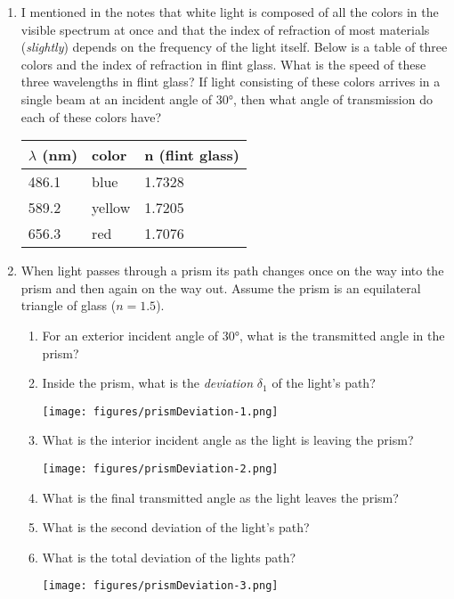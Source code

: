 \begin{enumerate}
\item
I mentioned in the notes that white light is composed of all the colors in the visible spectrum at once and that the index of refraction of most materials (\emph{slightly}) depends on the frequency of the light itself. Below is a table of three colors and the index of refraction in flint glass. What is the speed of these three wavelengths in flint glass? If light consisting of these colors arrives in a single beam at an incident angle of \ang{30}, then what angle of transmission do each of these colors have?

 \begin{tabular}{lll}
 	\toprule
 	$\lambda$ (nm) & color & n (flint glass) \\
 	\midrule
 	\midrule
 	486.1 & blue & 1.7328\\
 	589.2 & yellow & 1.7205 \\
 	656.3 & red & 1.7076 \\
 	\bottomrule
 \end{tabular}

\item
When light passes through a prism its path changes once on the way into the prism and then again on the way out. Assume the prism is an equilateral triangle of glass ($n=1.5$).

\begin{enumerate}
	\setlength\itemsep{1 in}
	\item For an exterior incident angle of \ang{30}, what is the transmitted angle in the prism?
	
	\item Inside the prism, what is the \emph{deviation} $\delta_1$ of the light's path?
	
	\texttt{[image: figures/prismDeviation-1.png]}
	
	\item What is the interior incident angle as the light is leaving the prism?
	
	\texttt{[image: figures/prismDeviation-2.png]}
	
	\item What is the final transmitted angle as the light leaves the prism?
	
	\item What is the second deviation of the light's path?
	
	\item What is the total deviation of the lights path?
	
	\texttt{[image: figures/prismDeviation-3.png]}
	

\end{enumerate}
\end{enumerate}
